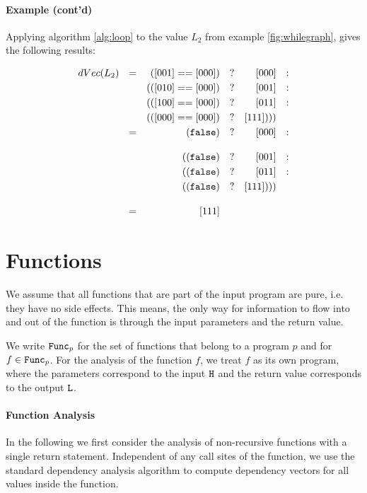 \paragraph{Example (cont'd)}
Applying algorithm \ref{alg:loop} to the value $L_2$ from example \ref{fig:whilegraph}, gives the following results:
\begin{center}
\begin{align*}
    dVec(L_2) && = &&([001] == [000]) && ? && [000] && : \\
        && && (([010] == [000]) && ? && [001] && : \\
        && && (([100] == [000]) && ? && [011] && : \\
        && && (([000] == [000]) && ? && [111]))) && \\
        && = && (\mathtt{false}) && ? && [000] && : \\[1em]
        && && ((\mathtt{false}) && ? && [001] && : \\
        && && ((\mathtt{false}) && ? && [011] && : \\
        && && ((\mathtt{false}) && ? && [111]))) && \\[1em]
        && = && [111]
    \end{align*}
\end{center}

\section{Functions}\label{sec:functions}
We assume that all functions that are part of the input program are pure, i.e. they have no side effects. This means, the only way for information to flow into and out of the function is through the input parameters and the return value.

We write $\mathtt{Func}_p$ for the set of functions that belong to a program $p$ and for $f \in \mathtt{Func}_p$. For the analysis of the function $f$, we treat $f$ as its own program, where the parameters correspond to the input $\mathtt{H}$ and the return value corresponds to the output $\mathtt{L}$.

\paragraph{Function Analysis}
In the following we first consider the analysis of non-recursive functions with a single return statement. Independent of any call sites of the function, we use the standard dependency analysis algorithm to compute dependency vectors for all values inside the function.


